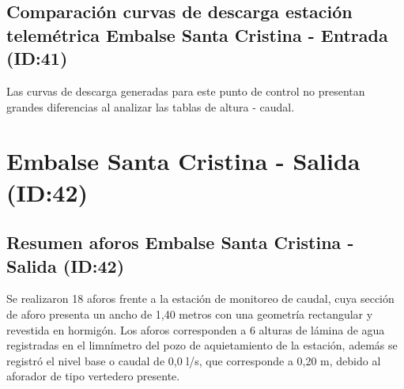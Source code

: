 \documentclass[]{article}
\begin{document}
\subsection{Comparación curvas de descarga estación telemétrica Embalse Santa Cristina - Entrada (ID:41)}\label{comparación curvas}

Las curvas de descarga generadas para este punto de control no presentan grandes diferencias al analizar las tablas de altura - caudal.

\clearpage

\section{Embalse Santa Cristina - Salida (ID:42)}\label{ID:42}

\subsection{Resumen aforos Embalse Santa Cristina - Salida (ID:42)}\label{aforos ID:42}

Se realizaron 18 aforos frente a la estación de monitoreo de caudal, cuya sección de aforo presenta un ancho de 1,40 metros con una geometría rectangular y revestida en hormigón.  Los aforos corresponden a 6 alturas de lámina de agua registradas en el limnímetro del pozo de aquietamiento de la estación, además se registró el nivel base o caudal de 0,0 l/s, que corresponde a 0,20 m, debido al aforador de tipo vertedero presente.
\end{document}

